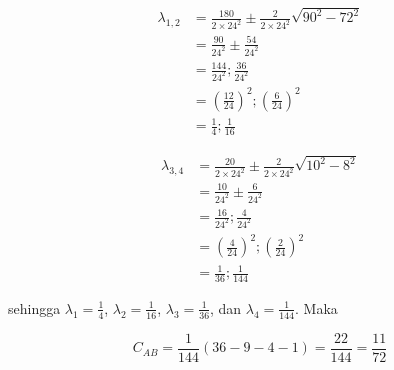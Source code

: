 \begin{equation}
	\begin{aligned}
		\lambda_{1,2}
		&=\frac{180}{2\times24^2}\pm\frac{2}{2\times24^2}\sqrt{90^2-72^2}\\
		&=\frac{90}{24^2}\pm\frac{54}{24^2}\\
		&=\frac{144}{24^2}; \frac{36}{24^2}\\
		&=(\frac{12}{24})^2; (\frac{6}{24})^2\\
		&=\frac{1}{4}; \frac{1}{16}
	\end{aligned}
\end{equation}

\begin{equation}
	\begin{aligned}
		\lambda_{3,4}
		&=\frac{20}{2\times24^2}\pm\frac{2}{2\times24^2}\sqrt{10^2-8^2}\\
		&=\frac{10}{24^2}\pm\frac{6}{24^2}\\
		&=\frac{16}{24^2}; \frac{4}{24^2}\\
		&=(\frac{4}{24})^2; (\frac{2}{24})^2\\
		&=\frac{1}{36}; \frac{1}{144}
	\end{aligned}
\end{equation}

sehingga $\lambda_1=\frac{1}{4}$, $\lambda_2=\frac{1}{16}$, $\lambda_3=\frac{1}{36}$, dan $\lambda_4=\frac{1}{144}$. Maka

\begin{equation}
	C_{AB}=\frac{1}{144}(36-9-4-1)=\frac{22}{144}=\frac{11}{72}
\end{equation}

